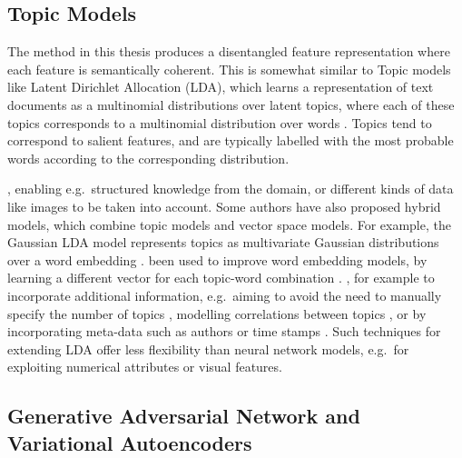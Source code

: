 \subsection{Topic Models}\label{bg:TopicModels}

The method in this thesis produces a disentangled feature representation where each feature is semantically coherent. This is somewhat similar to Topic models like Latent Dirichlet Allocation (LDA), which learns a representation of text documents as  a multinomial distributions over latent topics, where each of these topics corresponds to a multinomial distribution over words \cite{Blei03latentdirichlet}.  Topics tend to correspond to salient features, and are typically labelled with the most probable words according to the corresponding distribution.  

, enabling e.g.\ structured knowledge from the domain, or different kinds of data like images to be taken into account. Some authors have also proposed hybrid models, which combine topic models and vector space models. For example, the Gaussian LDA model represents topics as multivariate Gaussian distributions over a word embedding \cite{DBLP:conf/acl/DasZD15}.  been used to improve word embedding models, by learning a different vector for each topic-word combination \cite{DBLP:conf/aaai/LiuLCS15}. , for example to incorporate additional information, e.g.\ aiming to avoid the need to manually specify the number of topics \cite{teh2005sharing}, modelling correlations between topics \cite{Blei2006}, or by incorporating meta-data such as authors or time stamps \cite{rosen2004author,wang2006topics}. Such techniques for extending LDA offer less flexibility than neural network models, e.g.\ for exploiting numerical attributes or visual features. 



\subsection{Generative Adversarial Network and Variational Autoencoders}

